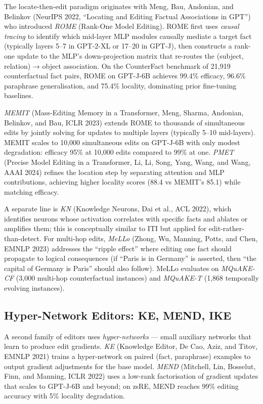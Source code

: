 The locate-then-edit paradigm originates with Meng, Bau, Andonian, and Belinkov (NeurIPS 2022, ``Locating and Editing Factual Associations in GPT'') who introduced \emph{ROME} (Rank-One Model Editing). ROME first uses \emph{causal tracing} to identify which mid-layer MLP modules causally mediate a target fact (typically layers 5--7 in GPT-2-XL or 17--20 in GPT-J), then constructs a rank-one update to the MLP's down-projection matrix that re-routes the (subject, relation) → object association. On the CounterFact benchmark of 21,919 counterfactual fact pairs, ROME on GPT-J-6B achieves 99.4\% efficacy, 96.6\% paraphrase generalisation, and 75.4\% locality, dominating prior fine-tuning baselines.

\emph{MEMIT} (Mass-Editing Memory in a Transformer, Meng, Sharma, Andonian, Belinkov, and Bau, ICLR 2023) extends ROME to thousands of simultaneous edits by jointly solving for updates to multiple layers (typically 5--10 mid-layers). MEMIT scales to 10,000 simultaneous edits on GPT-J-6B with only modest degradation: efficacy 95\% at 10,000 edits compared to 99\% at one. \emph{PMET} (Precise Model Editing in a Transformer, Li, Li, Song, Yang, Wang, and Wang, AAAI 2024) refines the location step by separating attention and MLP contributions, achieving higher locality scores (88.4 vs MEMIT's 85.1) while matching efficacy.

A separate line is \emph{KN} (Knowledge Neurons, Dai et al., ACL 2022), which identifies neurons whose activation correlates with specific facts and ablates or amplifies them; this is conceptually similar to ITI but applied for edit-rather-than-detect. For multi-hop edits, \emph{MeLLo} (Zhong, Wu, Manning, Potts, and Chen, EMNLP 2023) addresses the ``ripple effect'' where editing one fact should propagate to logical consequences (if ``Paris is in Germany'' is asserted, then ``the capital of Germany is Paris'' should also follow). MeLLo evaluates on \emph{MQuAKE-CF} (3,000 multi-hop counterfactual instances) and \emph{MQuAKE-T} (1,868 temporally evolving instances).

\subsection{Hyper-Network Editors: KE, MEND, IKE}\label{hyper-network-editors-ke-mend-ike}

A second family of editors uses \emph{hyper-networks} --- small auxiliary networks that learn to produce edit gradients. \emph{KE} (Knowledge Editor, De Cao, Aziz, and Titov, EMNLP 2021) trains a hyper-network on paired (fact, paraphrase) examples to output gradient adjustments for the base model. \emph{MEND} (Mitchell, Lin, Bosselut, Finn, and Manning, ICLR 2022) uses a low-rank factorisation of gradient updates that scales to GPT-J-6B and beyond; on zsRE, MEND reaches 99\% editing accuracy with 5\% locality degradation.

